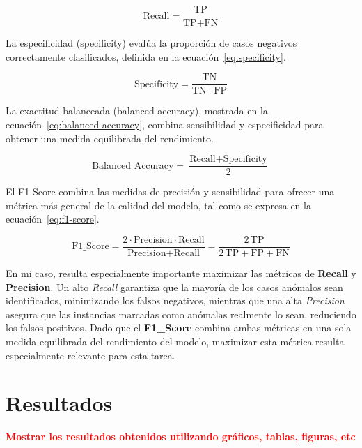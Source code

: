 \documentclass[a4paper,10pt]{book}
\newcommand{\comentario}[1]{\textbf{\textcolor{red}{#1}}}
\begin{document}
\begin{equation}
	\text{Recall} =
	\frac{\text{TP}}
	{\text{TP} + \text{FN}}
	\label{eq:recall}
\end{equation}

La especificidad (specificity) evalúa la proporción de casos negativos correctamente clasificados, definida en la ecuación~\ref{eq:specificity}.

\begin{equation}
	\text{Specificity} =
	\frac{\text{TN}}
	{\text{TN} + \text{FP}}
	\label{eq:specificity}
\end{equation}

La exactitud balanceada (balanced accuracy), mostrada en la ecuación~\ref{eq:balanced-accuracy}, combina sensibilidad y especificidad para obtener una medida equilibrada del rendimiento.

\begin{equation}
	\text{Balanced Accuracy} =
	\frac{\text{Recall} + \text{Specificity}}{2}
	\label{eq:balanced-accuracy}
\end{equation}

El F1-Score combina las medidas de precisión y sensibilidad para ofrecer una métrica más general de la calidad del modelo, tal como se expresa en la ecuación~\ref{eq:f1-score}.

\begin{equation}
	\text{F1\_Score} =
	\frac{2 \cdot \text{Precision} \cdot \text{Recall}}
	{\text{Precision} + \text{Recall}}
	=
	\frac{2\,\text{TP}}
	{2\,\text{TP} + \text{FP} + \text{FN}}
	\label{eq:f1-score}
\end{equation}

En mi caso, resulta especialmente importante maximizar las métricas de \textbf{Recall} y \textbf{Precision}. Un alto \textit{Recall} garantiza que la mayoría de los casos anómalos sean identificados, minimizando los falsos negativos, mientras que una alta \textit{Precision} asegura que las instancias marcadas como anómalas realmente lo sean, reduciendo los falsos positivos. Dado que el \textbf{F1\_Score} combina ambas métricas en una sola medida equilibrada del rendimiento del modelo, maximizar esta métrica resulta especialmente relevante para esta tarea.

\chapter{Resultados}

\comentario{Mostrar los resultados obtenidos utilizando gráficos, tablas, figuras, etc}
\end{document}
